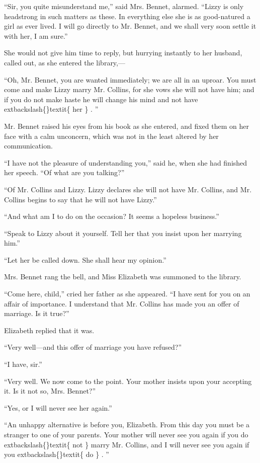 \documentclass[10pt]{book}
\begin{document}
   “Sir, you quite misunderstand me,” said Mrs. Bennet, alarmed. “Lizzy is
only headstrong in such matters as these. In everything else she is as
good-natured a girl as ever lived. I will go directly to Mr. Bennet, and
we shall very soon settle it with her, I am sure.”
  

   She would not give him time to reply, but hurrying instantly to her
husband, called out, as she entered the library,—
  

   “Oh, Mr. Bennet, you are wanted immediately; we are all in an uproar.
You must come and make Lizzy marry Mr. Collins, for she vows she will
not have him; and if you do not make haste he will change his mind and
not have
   	extbackslash\{\}textit\{
    her
   \}
   .
   ”
  

   Mr. Bennet raised his eyes from his book as she entered, and fixed them
on her face with a calm unconcern, which was not in the least altered by
her communication.
  

   “I have not the pleasure of understanding you,” said he, when she had
finished her speech. “Of what are you talking?”
  

   “Of Mr. Collins and Lizzy. Lizzy declares she will not have Mr. Collins,
and Mr. Collins begins to say that he will not have Lizzy.”
  

   “And what am I to do on the occasion? It seems a hopeless business.”
  

   “Speak to Lizzy about it yourself. Tell her that you insist upon her
marrying him.”
  

   “Let her be called down. She shall hear my opinion.”
  

   Mrs. Bennet rang the bell, and Miss Elizabeth was summoned to the
library.
  

   “Come here, child,” cried her father as she appeared. “I have sent for
you on an affair of importance. I understand that Mr. Collins has made
you an offer of marriage. Is it true?”
  

   Elizabeth replied that it was.
  

   “Very well—and this offer of marriage you have refused?”
  

   “I have, sir.”
  

   “Very well. We now come to the point. Your mother insists upon your
accepting it. Is it not so, Mrs. Bennet?”
  

   “Yes, or I will never see her again.”
  

   “An unhappy alternative is before you, Elizabeth. From this day you must
be a stranger to one of your parents. Your mother will never see you
again if you do
   	extbackslash\{\}textit\{
    not
   \}
   marry Mr. Collins, and I will never see you again
if you
   	extbackslash\{\}textit\{
    do
   \}
   .
   ”
  
\end{document}
